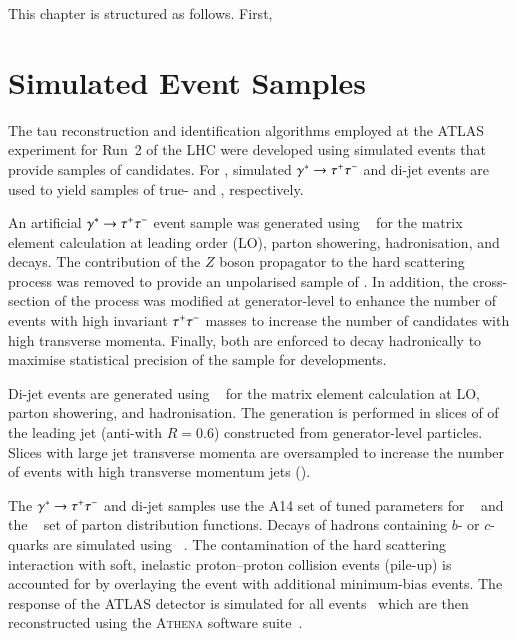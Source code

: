 This chapter is structured as follows. First,






\section{Simulated Event Samples}%
\label{sec:tauid_mc}

The tau reconstruction and identification algorithms employed at the
ATLAS experiment for Run~2 of the LHC were developed using simulated
events that provide samples of \tauhadvis candidates. For \tauid,
simulated $\gamma^{*} \to \tau^{+} \tau^{-}$ and di-jet events are used to yield
samples of true- and \faketauhadvis, respectively.

An artificial $\gamma^{*} \to \tau^{+} \tau^{-}$ event sample was generated
using \PYTHIA[8.212]~\cite{Sjostrand:2014zea} for the matrix element
calculation at leading order (LO), parton showering, hadronisation,
and \taulepton decays. The contribution of the $Z$ boson propagator to
the hard scattering process was removed to provide an unpolarised
sample of \tauleptons. In addition, the cross-section of the process
was modified at generator-level to enhance the number of events with
high invariant $\tau^{+} \tau^{-}$ masses to increase the number of \tauhadvis
candidates with high transverse momenta. Finally, both \tauleptons are
enforced to decay hadronically to maximise statistical precision of
the \truetauhadvis sample for \tauid developments.

Di-jet events are generated using
\PYTHIA[8.186]~\cite{Sjostrand:2014zea} for the matrix element
calculation at LO, parton showering, and hadronisation. The generation
is performed in slices of \pT of the leading jet (anti-\kt with
$R = 0.6$) constructed from generator-level particles. Slices with
large jet transverse momenta are oversampled to increase the number of
events with high transverse momentum jets (\faketauhadvis).

The $\gamma^{*} \to \tau^{+} \tau^{-}$ and di-jet samples use the A14 set of
tuned parameters for \PYTHIA[8]~\cite{ATL-PHYS-PUB-2014-021} and the
\NNPDF[2.3lo]~\cite{Ball:2012cx} set of parton distribution functions.
Decays of hadrons containing $b$- or $c$-quarks are simulated using
\EVTGEN[v1.2.0]~\cite{Lange:2001uf}. The contamination of the hard
scattering interaction with soft, inelastic proton--proton collision
events (pile-up) is accounted for by overlaying the event with
additional minimum-bias events. The response of the ATLAS detector is
simulated for all events~\cite{SOFT-2010-01} which are then
reconstructed using the \textsc{Athena} software
suite~\cite{ATL-SOFT-PUB-2021-001}.


